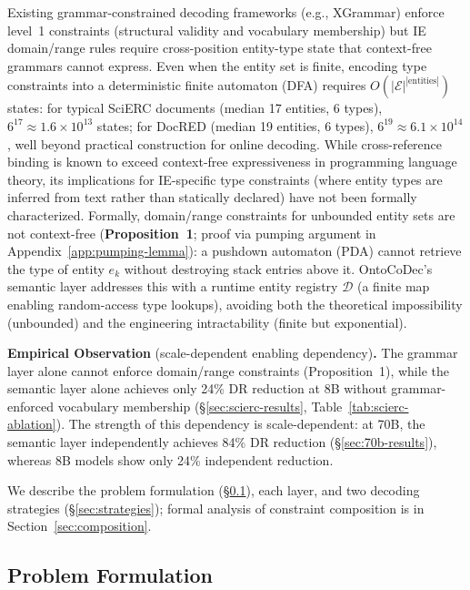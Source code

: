 \smallskip
\noindent
Existing grammar-constrained decoding frameworks (e.g., XGrammar) enforce level~1 constraints (structural validity and vocabulary membership) but IE domain/range rules require cross-position entity-type state that context-free grammars cannot express.
Even when the entity set is finite, encoding type constraints into a deterministic finite automaton (DFA) requires $O(|\mathcal{E}|^{|\text{entities}|})$ states: for typical SciERC documents (median 17 entities, 6 types), $6^{17} \approx 1.6{\times}10^{13}$ states; for DocRED (median 19 entities, 6 types), $6^{19} \approx 6.1{\times}10^{14}$, well beyond practical construction for online decoding.
While cross-reference binding is known to exceed context-free expressiveness in programming language theory, its implications for IE-specific type constraints (where entity types are inferred from text rather than statically declared) have not been formally characterized.
Formally, domain/range constraints for unbounded entity sets are not context-free (\textbf{Proposition~1}; proof via pumping argument in Appendix~\ref{app:pumping-lemma}): a pushdown automaton (PDA) cannot retrieve the type of entity $e_k$ without destroying stack entries above it.
OntoCoDec's semantic layer addresses this with a runtime entity registry $\mathcal{D}$ (a finite map enabling random-access type lookups), avoiding both the theoretical impossibility (unbounded) and the engineering intractability (finite but exponential).

\noindent\textbf{Empirical Observation} (scale-dependent enabling dependency)\textbf{.} The grammar layer alone cannot enforce domain/range constraints (Proposition~1), while the semantic layer alone achieves only 24\% DR reduction at 8B without grammar-enforced vocabulary membership (\S\ref{sec:scierc-results}, Table~\ref{tab:scierc-ablation}).
The strength of this dependency is scale-dependent: at 70B, the semantic layer independently achieves 84\% DR reduction (\S\ref{sec:70b-results}), whereas 8B models show only 24\% independent reduction.
\smallskip

We describe the problem formulation (\S\ref{sec:formulation}), each layer, and two decoding strategies (\S\ref{sec:strategies}); formal analysis of constraint composition is in Section~\ref{sec:composition}.


\subsection{Problem Formulation}
\label{sec:formulation}

